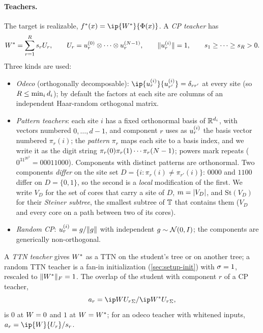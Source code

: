 \paragraph{Teachers.}
The target is realizable, $f^*(x)=\ip{\Wt}{\Feat(x)}$. A \emph{CP teacher} has
\begin{equation}\label{eq:cp-teacher}
  \Wt=\sum_{r=1}^{\ncomp}\tw{r}\U{r},\qquad
  \U{r}=\fac{r}{0}\otimes\dots\otimes\fac{r}{\Ns-1},\qquad
  \norm{\fac{r}{i}}=1,\qquad \tw{1}\ge\dots\ge\tw{\ncomp}>0.
\end{equation}
Three kinds are used:
\begin{itemize}
  \item \emph{Odeco} (orthogonally decomposable): $\ip{\fac{r}{i}}{\fac{r'}{i}}=\delta_{rr'}$ at every
    site (so $\ncomp\le\min_i\pd[i]$); by default the factors at each site are columns of an
    independent Haar-random orthogonal matrix.
  \item \emph{Pattern teachers}: each site $i$ has a fixed orthonormal basis of $\R^{\pd[i]}$, with
    vectors numbered $0,\dots,d-1$, and component $r$ uses as $\fac{r}{i}$ the basis vector numbered
    $\pi_r(i)$; the \emph{pattern} $\pi_r$ maps each site to a basis index, and we write it as the digit string
    $\pi_r(0)\pi_r(1)\cdots\pi_r(\Ns-1)$; powers mark repeats ($0^31^20^3=00011000$). Components with
    distinct patterns are orthonormal. Two components \emph{differ} on the site set
    $D=\{i:\pi_r(i)\ne\pi_{r'}(i)\}$: $0000$ and $1100$ differ on $D=\{0,1\}$, so the second is a
    \emph{local} modification of the first. We write $V_D$ for the set of cores that carry a site of
    $D$, $m=\abs{V_D}$, and $\mathrm{St}(V_D)$ for their \emph{Steiner subtree}, the smallest subtree
    of $\tree$ that contains them ($V_D$ and every core on a path between two of its cores).
  \item \emph{Random CP}: $\fac{r}{i}=g/\norm{g}$ with independent $g\sim\Normal(0,\Id)$; the
    components are generically non-orthogonal.
\end{itemize}
A \emph{TTN teacher} gives $\Wt$ as a TTN on the student's tree or on another tree; a random TTN
teacher is a fan-in initialization (\cref{sec:setup-init}) with $\isc=1$, rescaled to
$\normF{\Wt}=1$. The overlap of the student with component $r$ of a CP teacher,
\begin{equation}\label{eq:overlap}
  \ov{r}=\ipS{\W}{\U{r}}/\ipS{\Wt}{\U{r}},
\end{equation}
is $0$ at $\W=0$ and $1$ at $\W=\Wt$; for an odeco teacher with whitened inputs,
$\ov{r}=\ip{\W}{\U{r}}/\tw{r}$.


